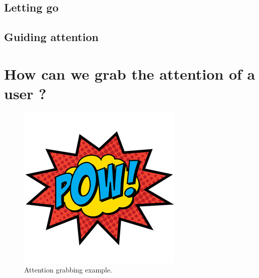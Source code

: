 \documentclass{report}
\begin{document}
				\section{Letting go}
				
				
				\section{Guiding attention}
				
				
				
				
				\chapter{How can we grab the attention of a user ?}
				
				\begin{figure}[h!]
					\centering
					\includegraphics[width=\linewidth/3]{img/pow.jpg}
					\caption{Attention grabbing example.}
					\label{fig:pow}
				\end{figure}
				
\end{document}
